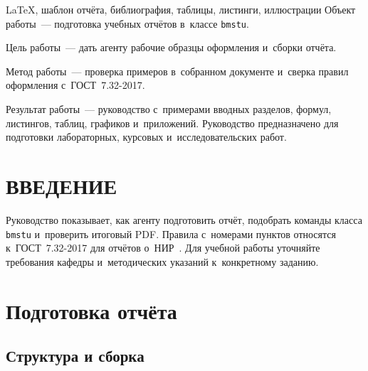 \documentclass{bmstu}
\begin{document}
\begin{essay}{LaTeX, шаблон отчёта, библиография, таблицы, листинги, иллюстрации}
Объект работы~--- подготовка учебных отчётов в~классе \texttt{bmstu}.

Цель работы~--- дать агенту рабочие образцы оформления и~сборки отчёта.

Метод работы~--- проверка примеров в~собранном документе и~сверка правил оформления с~ГОСТ~7.32-2017.

Результат работы~--- руководство с~примерами вводных разделов, формул, листингов, таблиц, графиков и~приложений.
Руководство предназначено для подготовки лабораторных, курсовых и~исследовательских работ.
\end{essay}

\maketableofcontents

\begin{definitions}
\end{definitions}

\begin{abbreviations}
\end{abbreviations}

\chapter*{ВВЕДЕНИЕ}

Руководство показывает, как агенту подготовить отчёт, подобрать команды класса \texttt{bmstu} и~проверить итоговый PDF.
Правила с~номерами пунктов относятся к~ГОСТ~7.32-2017 для отчётов о~НИР~\cite{gost732}.
Для учебной работы уточняйте требования кафедры и~методических указаний к~конкретному заданию.

\chapter{Подготовка отчёта}

\section{Структура и сборка}
\end{document}
